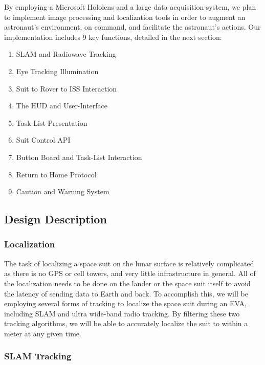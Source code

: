\documentclass{article}
\let\Oldsubsection\subsection
\renewcommand{\subsection}{\FloatBarrier\Oldsubsection}
\let\Oldsubsubsection\subsubsection
\renewcommand{\subsubsection}{\FloatBarrier\Oldsubsubsection}
\begin{document}
By employing a Microsoft Hololens \autocite{mrbasics} \autocite{mannedspaceflight} and a large data acquisition system, we plan to implement image processing and localization tools in order to augment an astronaut's environment, on command, and facilitate the astronaut's actions. Our implementation includes 9 key functions, detailed in the next section:

\begin{enumerate}
\item SLAM and Radiowave Tracking
\item Eye Tracking Illumination
\item Suit to Rover to ISS Interaction
\item The HUD and User-Interface
\item Task-List Presentation
\item Suit Control API
\item Button Board and Task-List Interaction
\item Return to Home Protocol
\item Caution and Warning System
\end{enumerate}

\subsection{Design Description}

\subsubsection{Localization}

The task of localizing a space suit on the lunar surface is relatively complicated as there is no GPS or cell towers, and very little infrastructure in general. All of the localization needs to be done on the lander or the space suit itself to avoid the latency of sending data to Earth and back. To accomplish this, we will be employing several forms of tracking to localize the space suit during an EVA, including SLAM and ultra wide-band radio tracking. By filtering these two tracking algorithms, we will be able to accurately localize the suit to within a meter at any given time.

\subsubsection{SLAM Tracking}
\end{document}
